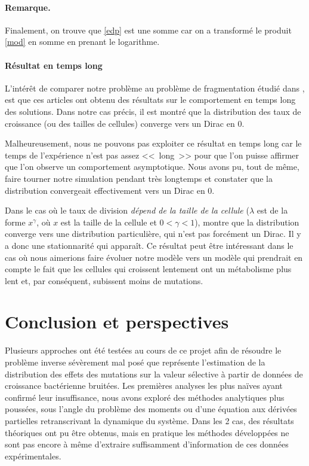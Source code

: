 \documentclass[12pt]{article}
\newcounter{thm}
\newcommand{\req}[1]{\paragraph{Remarque.}#1\vspace{0.1cm}}
\begin{document}
\req{Finalement, on trouve que \eqref{edp} est une somme car on a transformé le produit \eqref{mod} en somme en prenant le logarithme.}


\paragraph{Résultat en temps long} L'intérêt de comparer notre problème au problème de fragmentation étudié dans \cite{md1}, \cite{md2} est que ces articles ont obtenu des résultats sur le comportement en temps long des solutions. Dans notre cas précis, il est montré que la distribution des taux de croissance (ou des tailles de cellules) converge vers un Dirac en 0. 

Malheureusement, nous ne pouvons pas exploiter ce résultat en temps long car le temps de l'expérience n'est pas assez <<~long~>> pour que l'on puisse affirmer que l'on observe un comportement asymptotique. Nous avons pu, tout de même, faire tourner notre simulation pendant très longtemps et constater que la distribution convergeait effectivement vers un Dirac en 0.

Dans le cas où le taux de division \emph{dépend de la taille de la cellule} ($\lambda$ est de la forme $x^{\gamma}$, où $x$ est la taille de la cellule et $0<\gamma<1$), \cite{md2} montre que la distribution converge vers une distribution particulière, qui n'est pas forcément un Dirac. Il y a donc une stationnarité qui apparaît. Ce résultat peut être intéressant dans le cas où nous aimerions faire évoluer notre modèle vers un modèle qui prendrait en compte le fait que les cellules qui croissent lentement ont un métabolisme plus lent et, par conséquent, subissent moins de mutations.



\section{Conclusion et perspectives}

  Plusieurs approches ont été testées au cours de ce projet afin de résoudre le problème inverse sévèrement mal posé que représente l'estimation de la distribution des effets des mutations sur la valeur sélective à partir de données de croissance bactérienne bruitées. Les premières analyses les plus naïves ayant confirmé leur insuffisance, nous avons exploré des méthodes analytiques plus poussées, sous l'angle du problème des moments ou d'une équation aux dérivées partielles retranscrivant la dynamique du système. Dans les 2 cas, des résultats théoriques ont pu être obtenus, mais en pratique les méthodes développées ne sont pas encore à même d'extraire suffisamment d'information de ces données expérimentales.
  
\end{document}
